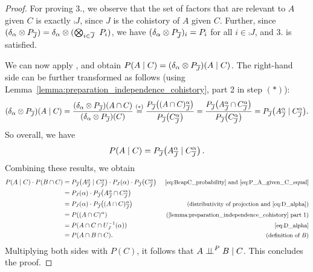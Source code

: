 \documentclass[USenglish,onecolumn]{article}
\begin{document}
\begin{proof}
  For proving 3., we observe that the set of factors that are relevant to $A$ given $C$ is exactly $\comp{J}$, since $J$ is the cohistory of $A$ given $C$. Further, since $(\delta_\x \otimes P_{\comp{J}})=\delta_\x \otimes (\bigotimes_{i\in \comp{J}}\ P_i)$, we have $(\delta_\alpha \otimes P_{{\overline{J}}})_i=P_i$ for all $i \in \comp{J}$, and 3. is satisfied.

  We can now apply    , and obtain $P(A \mid C) = (\delta_\alpha \otimes P_{{\overline{J}}})(A \mid C)$.
  The right-hand side can be further transformed as follows (using Lemma~\ref{lemma:preparation_independence_cohistory}, part 2 in step $(*)$):
  \begin{align*}
    (\delta_\alpha \otimes P_{{\overline{J}}})(A \mid C) = \frac{(\delta_\alpha \otimes P_{{\overline{J}}})(A \cap C)}{(\delta_\alpha \otimes P_{{\overline{J}}})(C)}
    \overset{(*)}{=} \frac{P_{{\overline{J}}}\big((A \cap C)^\alpha_{\overline{J}}\big)}{P_{{\overline{J}}}\big(C^\alpha_{\overline{J}}\big)} = \frac{P_{{\overline{J}}}\big( A^\alpha_{\overline{J}} \cap C^\alpha_{\overline{J}} \big)}{P_{{\overline{J}}}\big(C^\alpha_{\overline{J}}\big)} = P_{{\overline{J}}}\big( A^\alpha_{\overline{J}} \mid C^\alpha_{\overline{J}} \big).
  \end{align*}
  So overall, we have
  \begin{equation}
      \label{eq:P_A_given_C_equal}
  P(A \mid C) = P_{{\overline{J}}}\big(A^\alpha_{\overline{J}} \mid C^\alpha_{\overline{J}}\big)\,.
  \end{equation}
  Combining these results, we obtain
  \begin{align*}
    P(A \given C) \cdot P(B \cap C) &= P_{\comp{J}}\big( A^\alpha_\comp{J} \given C^\alpha_\comp{J} \big) \cdot P_J(\x) \cdot P_{\comp{J}}\big( C^\alpha_\comp{J} \big) &\text{\small\eqref{eq:BcapC_probability} and \eqref{eq:P_A_given_C_equal}}\\
    &= P_J(\x) \cdot P_{\comp{J}}\big(A^\alpha_\comp{J} \cap C^\alpha_\comp{J}\big) \\
    &= P_J(\x) \cdot P_{\comp{J}}\big((A \cap C)^\alpha_\comp{J}  \big)&\text{\small(distributivity of projection and \eqref{eq:D_alpha})}\\
    &= P((A\cap C)^\alpha) &\text{\small(\Cref{lemma:preparation_independence_cohistory} part 1)}\\
    &=P(A\cap C \cap U_J^{-1}(\alpha))&\text{\small \eqref{eq:D_alpha}}\\
    &= P(A \cap B \cap C).&\text{\small(definition of $B$)}
  \end{align*}
  Multiplying both sides with $P(C)$, it follows that $A\mathrel{\perp\!\!\!\perp}^P B\mid C$. This concludes the proof.
\end{proof}
\end{document}
